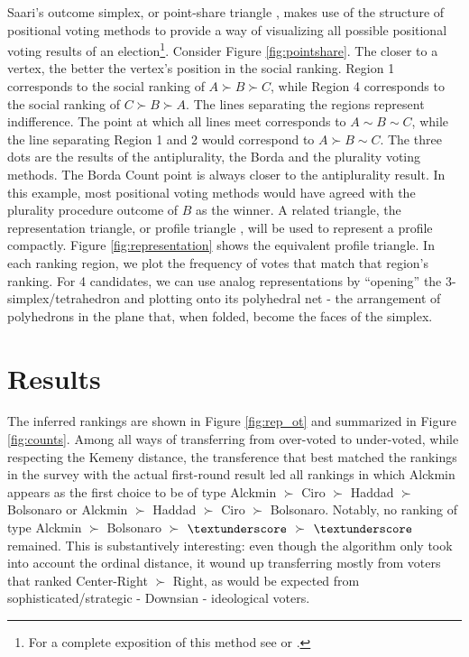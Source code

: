 \documentclass[hidelinks,11pt]{article} \usepackage[utf8]{inputenc}
\begin{document}

Saari's outcome simplex, or point-share triangle
\parencite{eggers20_diagr_analy_ordin_votin_system}, makes use of the structure
of positional voting methods to provide a way of visualizing all possible
positional voting results of an election\footnote{For a complete exposition of
  this method see \textcite{saari1995basic} or \textcite{nurmi2002voting}.}.
Consider Figure \ref{fig:pointshare}. The closer to a vertex, the better the
vertex's position in the social ranking. Region 1 corresponds to the social
ranking of \(A \succ B \succ C\), while Region 4 corresponds to the social ranking of
\(C\succ B\succ A\). The lines separating the regions represent indifference. The point at
which all lines meet corresponds to \(A \sim B \sim C\), while the line
separating Region 1 and 2 would correspond to \(A \succ B \sim C\). The three dots
are the results of the antiplurality, the Borda and the plurality voting
methods. The Borda Count point is always closer to the antiplurality result. In
this example, most positional voting methods would have agreed with the
plurality procedure outcome of \(B\) as the winner. A related triangle, the
representation triangle, or profile triangle
\parencite{eggers20_diagr_analy_ordin_votin_system}, will be used to represent a
profile compactly. Figure \ref{fig:representation} shows the equivalent profile
triangle. In each ranking region, we plot the frequency of votes that match that
region's ranking. For 4 candidates, we can use analog representations by
``opening'' the 3-simplex/tetrahedron and plotting onto its polyhedral net - the
arrangement of polyhedrons in the plane that, when folded, become the faces of
the simplex.

\section{Results}

The inferred rankings are shown in Figure \ref{fig:rep_ot} and summarized in Figure \ref{fig:counts}.
Among all ways of transferring from over-voted to under-voted, while respecting
the Kemeny distance, the transference that best matched the rankings in the
survey with the actual first-round result led all rankings in which Alckmin
appears as the first choice to be of type Alckmin \(\succ\) Ciro \(\succ\) Haddad \(\succ\) Bolsonaro or
Alckmin \(\succ\) Haddad \(\succ\) Ciro \(\succ\) Bolsonaro. Notably, no ranking of type Alckmin \(\succ\)
Bolsonaro \(\succ\) \(\textunderscore\) \(\succ\) \(\textunderscore\) remained. This is
substantively interesting: even though the algorithm only took into account the
ordinal distance, it wound up transferring mostly from voters that ranked
Center-Right \(\succ\) Right, as would be expected from sophisticated/strategic -
Downsian - ideological voters.
\end{document}
